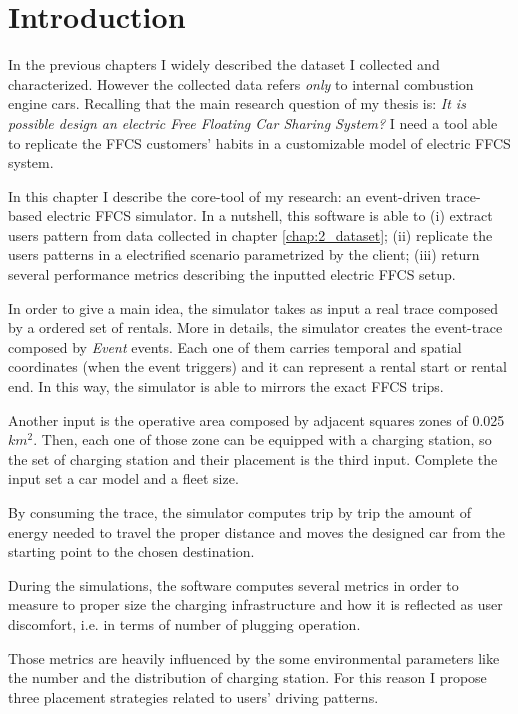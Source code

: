 \section{Introduction}
In the previous chapters I widely described the dataset I collected and characterized. However the collected data refers \emph{only} to internal combustion engine cars. Recalling that the main research question of my thesis is: \emph{It is possible design an electric Free Floating Car Sharing System?} I need a tool able to replicate the FFCS customers' habits in a customizable model of electric FFCS system. 

In this chapter I describe the core-tool of my research: an event-driven trace-based electric FFCS simulator. In a nutshell, this software is able to (i)  extract users pattern from data collected in chapter \ref{chap:2_dataset}; (ii) replicate the users patterns in a electrified scenario parametrized by the client; (iii) return several performance metrics describing the inputted electric FFCS setup.

In order to give a main idea, the simulator takes as input a real trace composed by a ordered set of rentals. More in details, the simulator creates the event-trace composed by \emph{Event} events. Each one of them carries temporal and spatial coordinates (when the event triggers) and it can represent a rental start or rental end. In this way, the simulator is able to mirrors the exact FFCS trips. 

Another input is the operative area composed by adjacent squares zones of 0.025 $km^2$. Then, each one of those zone can be equipped with a charging station, so the set of charging station and their placement is the third input. Complete the input set a car model and a fleet size.

By consuming the trace, the simulator computes trip by trip the amount of energy needed to travel the proper distance and moves the designed car from the starting point to the chosen destination. 

During the simulations, the software computes several metrics in order to measure to proper size the charging infrastructure and how it is reflected as user discomfort, i.e. in terms of number of plugging operation.

Those metrics are heavily influenced by the some environmental parameters like the number and the distribution of charging station. For this reason I propose three placement strategies related to users' driving patterns. 

